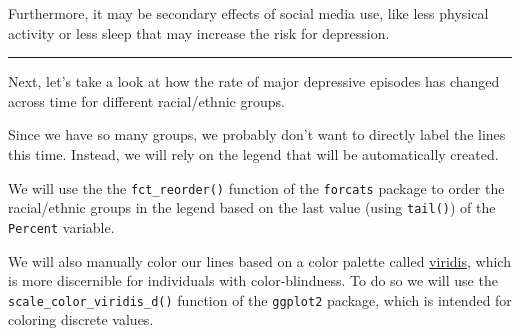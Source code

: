 \documentclass[
]{article}
\begin{document}
Furthermore, it may be secondary effects of social media use, like less
physical activity or less sleep that may increase the risk for
depression.

\begin{center}\rule{0.5\linewidth}{0.5pt}\end{center}

Next, let's take a look at how the rate of major depressive episodes has
changed across time for different racial/ethnic groups.

Since we have so many groups, we probably don't want to directly label
the lines this time. Instead, we will rely on the legend that will be
automatically created.

We will use the the \texttt{fct\_reorder()} function of the
\texttt{forcats} package to order the racial/ethnic groups in the legend
based on the last value (using \texttt{tail()}) of the \texttt{Percent}
variable.

We will also manually color our lines based on a color palette called
\href{https://cran.r-project.org/web/packages/viridis/vignettes/intro-to-viridis.html}{viridis},
which is more discernible for individuals with color-blindness. To do so
we will use the \texttt{scale\_color\_viridis\_d()} function of the
\texttt{ggplot2} package, which is intended for coloring discrete
values.
\end{document}
